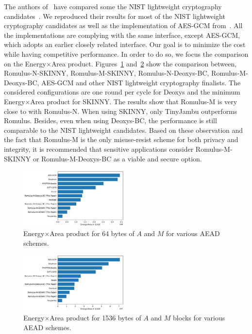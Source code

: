\documentclass[conference]{IEEEtran}
\begin{document}
The authors of~\cite{benchmarking} have compared some the NIST lightweight cryptography candidates~\cite{turan2021status}. We reproduced their results for most of the NIST lightweight cryptography candidates as well as the implementation of AES-GCM from~\cite{gmu}. All the implementations are complying with the same interface, except AES-GCM, which adopts an earlier closely related interface. Our goal is to minimize the cost while having competitive performance. In order to do so, we focus the comparison on the Energy$\times$Area product. Figures~\ref{fig:energy_area_64} and~\ref{fig:energy_area_1536} show the comparison between, Romulus-N-SKINNY, Romulus-M-SKINNY, Romulus-N-Deoxys-BC, Romulus-M-Deoxys-BC, AES-GCM and other NIST lightweight cryptography finalists. The considered configurations are one round per cycle for Deoxys and the minimum Energy$\times$Area product for SKINNY. The results show that Romulus-M is very close to with Romulus-N. When using SKINNY, only TinyJambu outperforms Romulus. Besides, even when using Deoxys-BC, the performance is still comparable to the NIST lightweight candidates. Based on these observation and the fact that Romulus-M is the only misuse-resist scheme for both privacy and integrity, it is recommended that sensitive applications consider Romulus-M-SKINNY or Romulus-M-Deoxys-BC as a viable and secure option.

\begin{figure}[!h]
  \centering
  \includegraphics[width=0.49\textwidth]{figures/withM_energy_area64_bar_65.pdf}
  \caption{Energy$\times$Area product for 64 bytes of $A$ and $M$ for various AEAD schemes.}\label{fig:energy_area_64}
\end{figure}

\begin{figure}[!h]
  \centering
  \includegraphics[width=0.49\textwidth]{figures/withM_energy_area1536_bar_65.pdf}
  \caption{Energy$\times$Area product for 1536 bytes of $A$ and $M$ blocks for various AEAD schemes.}\label{fig:energy_area_1536}
\end{figure}
\end{document}
